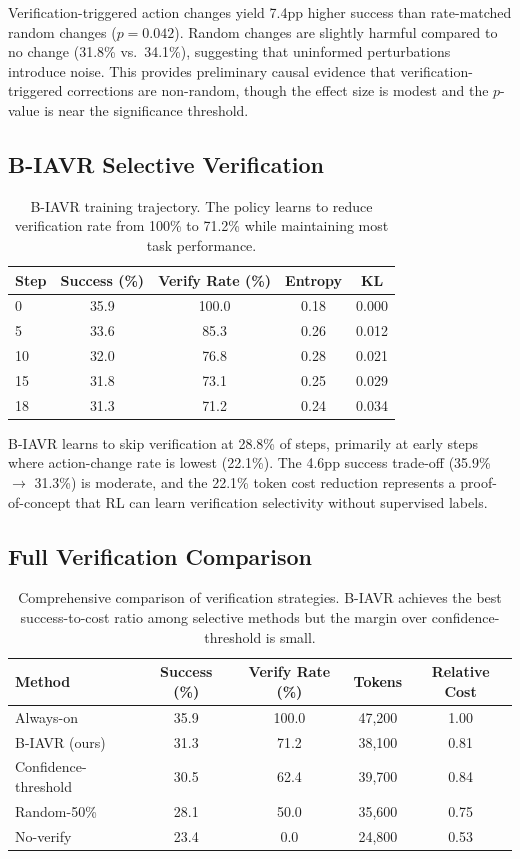 \documentclass{article}
\begin{document}
Verification-triggered action changes yield 7.4pp higher success than rate-matched random changes ($p = 0.042$). Random changes are slightly harmful compared to no change (31.8\% vs.\ 34.1\%), suggesting that uninformed perturbations introduce noise. This provides preliminary causal evidence that verification-triggered corrections are non-random, though the effect size is modest and the $p$-value is near the significance threshold.

\subsection{B-IAVR Selective Verification}

\begin{table}[h]
\centering
\caption{B-IAVR training trajectory. The policy learns to reduce verification rate from 100\% to 71.2\% while maintaining most task performance.}
\begin{tabular}{lcccc}
\toprule
Step & Success (\%) & Verify Rate (\%) & Entropy & KL \\
\midrule
0 & 35.9 & 100.0 & 0.18 & 0.000 \\
5 & 33.6 & 85.3 & 0.26 & 0.012 \\
10 & 32.0 & 76.8 & 0.28 & 0.021 \\
15 & 31.8 & 73.1 & 0.25 & 0.029 \\
18 & 31.3 & 71.2 & 0.24 & 0.034 \\
\bottomrule
\end{tabular}
\label{tab:biavr}
\end{table}

B-IAVR learns to skip verification at 28.8\% of steps, primarily at early steps where action-change rate is lowest (22.1\%). The 4.6pp success trade-off (35.9\% $\to$ 31.3\%) is moderate, and the 22.1\% token cost reduction represents a proof-of-concept that RL can learn verification selectivity without supervised labels.

\subsection{Full Verification Comparison}

\begin{table}[h]
\centering
\caption{Comprehensive comparison of verification strategies. B-IAVR achieves the best success-to-cost ratio among selective methods but the margin over confidence-threshold is small.}
\begin{tabular}{lcccc}
\toprule
Method & Success (\%) & Verify Rate (\%) & Tokens & Relative Cost \\
\midrule
Always-on & 35.9 & 100.0 & 47,200 & 1.00 \\
B-IAVR (ours) & 31.3 & 71.2 & 38,100 & 0.81 \\
Confidence-threshold & 30.5 & 62.4 & 39,700 & 0.84 \\
Random-50\% & 28.1 & 50.0 & 35,600 & 0.75 \\
No-verify & 23.4 & 0.0 & 24,800 & 0.53 \\
\bottomrule
\end{tabular}
\label{tab:comparison}
\end{table}
\end{document}
